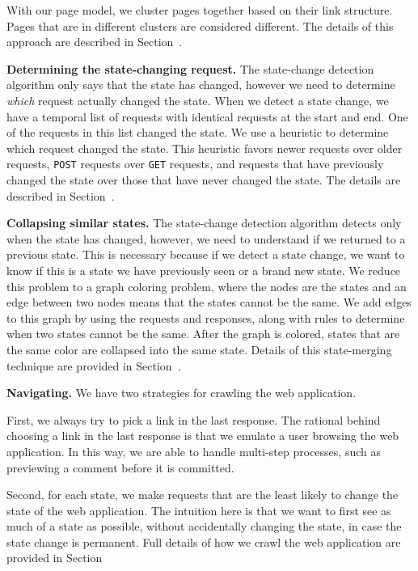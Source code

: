 With our page model, we cluster pages together based on their link structure.
Pages that are in different clusters are considered different. The details of
this approach are described in Section~.

\noindent \textbf{Determining the state-changing request.}
The state-change detection algorithm only says that the state has changed, however we
need to determine \emph{which} request actually changed the state. When we
detect a state change, we have a temporal list of requests with
identical requests at the start and end. One of the requests in this list
changed the state. We use a heuristic to determine which request changed the
state. This heuristic favors newer requests over older requests, \texttt{POST}
requests over \texttt{GET} requests, and requests that have previously changed
the state over those that have never changed the state. The details are
described in Section~.

\noindent \textbf{Collapsing similar states.}
The state-change detection algorithm detects only when the state has changed, however, we
need to understand if we returned to a previous state. This is necessary
because if we detect a state change, we want to know if this is a state we
have previously seen or a brand new state. We reduce this problem to a graph coloring problem, where the
nodes are the states and an edge between two nodes means that the states cannot
be the same. We add edges to this graph by using the requests and responses,
along with rules to determine when two states cannot be the same. After the
graph is colored, states that are the same color are collapsed into the same
state. Details of this state-merging technique are provided in Section~.

\noindent \textbf{Navigating.}
We have two strategies for crawling the web application.

First, we always try to pick a link in the last response. The rational behind choosing a
link in the last response is that we emulate a user browsing the web application.
In this way, we are able to handle multi-step processes, such as previewing a
comment before it is committed.

Second, for each state, we make requests that are the least likely to change
the state of the web application. The intuition here is that we want to first see
as much of a state as possible, without accidentally changing the state, in
case the state change is permanent. Full details of how we crawl the web
application are provided in Section~

